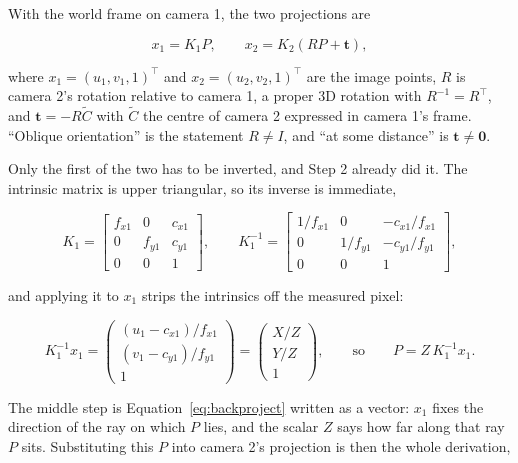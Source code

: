 \documentclass[11pt,a4paper]{article}
\begin{document}
With the world frame on camera 1, the two projections are

\begin{equation}
x_1 = K_1 P,
\qquad
x_2 = K_2 (R P + \mathbf{t}),
\label{eq:twoproj}
\end{equation}

\noindent
where $x_1 = (u_1, v_1, 1)^{\!\top}$ and $x_2 = (u_2, v_2, 1)^{\!\top}$ are the
image points, $R$ is camera 2's rotation relative to camera 1, a proper 3D
rotation with $R^{-1} = R^{\!\top}$, and $\mathbf{t} = -R\tilde{C}$ with
$\tilde{C}$ the centre of camera
2 expressed in camera 1's frame. ``Oblique orientation'' is the statement
$R \neq I$, and ``at some distance'' is $\mathbf{t} \neq \mathbf{0}$.

Only the first of the two has to be inverted, and Step 2 already did it. The
intrinsic matrix is upper triangular, so its inverse is immediate,

\begin{equation}
K_1 =
\begin{bmatrix}
f_{x1} & 0 & c_{x1} \\ 0 & f_{y1} & c_{y1} \\ 0 & 0 & 1
\end{bmatrix},
\qquad
K_1^{-1} =
\begin{bmatrix}
1/f_{x1} & 0 & -c_{x1}/f_{x1} \\
0 & 1/f_{y1} & -c_{y1}/f_{y1} \\
0 & 0 & 1
\end{bmatrix},
\label{eq:kinv}
\end{equation}

\noindent
and applying it to $x_1$ strips the intrinsics off the measured pixel:

\begin{equation}
K_1^{-1} x_1 =
\begin{pmatrix}
(u_1 - c_{x1})/f_{x1} \\ (v_1 - c_{y1})/f_{y1} \\ 1
\end{pmatrix}
=
\begin{pmatrix} X/Z \\ Y/Z \\ 1 \end{pmatrix},
\qquad\text{so}\qquad
P = Z\,K_1^{-1} x_1 .
\label{eq:invert}
\end{equation}

The middle step is Equation~\ref{eq:backproject} written as a vector: $x_1$
fixes the direction of the ray on which $P$ lies, and the scalar $Z$ says how
far along that ray $P$ sits. Substituting this $P$ into camera 2's projection
is then the whole derivation,
\end{document}
